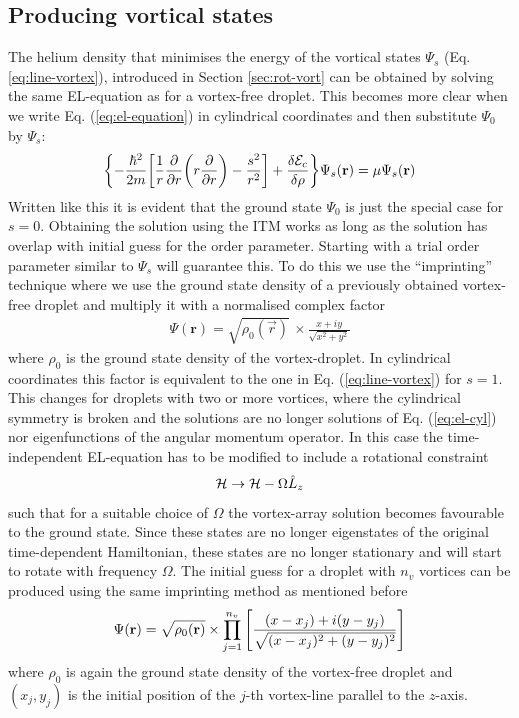 		\subsection{Producing vortical states}\label{sec:vortical-states}
			The helium density that minimises the energy of the vortical states $\Psi_s$ (Eq. \ref{eq:line-vortex}), introduced in Section \ref{sec:rot-vort} can be obtained by solving the same EL-equation as for a vortex-free droplet. This becomes more clear when we write Eq. (\ref{eq:el-equation}) in cylindrical coordinates and then substitute $\Psi_0$ by $\Psi_s$:
			\begin{align}
				\qty{-\frac{\hbar^2}{2m}\qty[\frac{1}{r}\pdv{r}\qty(r\pdv{r})-\frac{s^2}{r^2}]+\fdv{\mathcal{E}_c}{\rho}}\Psi_s(\vec{r}) = \mu\Psi_s(\vec{r}) \label{eq:el-cyl}
			\end{align}
			Written like this it is evident that the ground state $\Psi_0$ is just the special case for $s=0$. Obtaining the solution using the ITM works as long as the solution has overlap with initial guess for the order parameter. Starting with a trial order parameter similar to $\Psi_s$ will guarantee this. To do this we use the ``imprinting'' technique where we use the ground state density of a previously obtained vortex-free droplet and multiply it with a normalised complex factor
			\begin{align}
				\Psi(\mathbf{r}) = \sqrt{\rho_0(\vec{r})} \,\times \frac{x + iy}{\sqrt{x^2 + y^2}} \label{eq28}
			\end{align}
			where $\rho_0$ is the ground state density of the vortex-droplet.  In cylindrical coordinates this factor is equivalent to the one in Eq. (\ref{eq:line-vortex}) for $s=1$.\\ 
			
			This changes for droplets with two or more vortices, where the cylindrical symmetry is broken and the solutions are no longer solutions of Eq. (\ref{eq:el-cyl}) nor eigenfunctions of the angular momentum operator. In this case the time-independent EL-equation has to be modified to include a rotational constraint
			\begin{align}
				{\cal H} \rightarrow {\cal H}-\Omega \hat{L}_z
			\end{align}
			 such that for a suitable choice of $\Omega$ the vortex-array solution becomes favourable to the ground state. Since these states are no longer eigenstates of the original time-dependent Hamiltonian, these states are no longer stationary and will start to rotate with frequency $\Omega$. The initial guess for a droplet with $n_v$ vortices can be produced using the same imprinting method as mentioned before		
			\begin{align}
				\Psi(\mathbf{r})=\sqrt{\rho_0(\vec{r})} \times \prod _{j=1}^{n_v}\left[ {(x-x_j)+i(y-y_j) \over \sqrt{(x-x_j)^2+(y-y_j)^2}}  \right] \label{eq32}
			\end{align}
			where $\rho_0$ is again the ground state density of the vortex-free droplet and $(x_j,y_j)$ is the initial position of the $j$-th vortex-line parallel to the $z$-axis.

